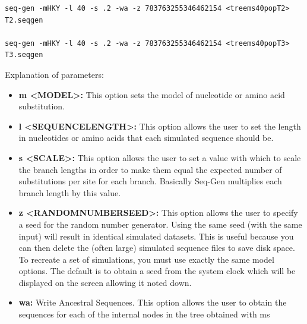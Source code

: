 \begin{itemize}
\begin{verbatim}
seq-gen -mHKY -l 40 -s .2 -wa -z 783763255346462154 <treems40popT2> T2.seqgen

seq-gen -mHKY -l 40 -s .2 -wa -z 783763255346462154 <treems40popT3> T3.seqgen

\end{verbatim}

Explanation of parameters:

\begin{itemize}

\item\textbf{m <MODEL>:} This option sets the model of nucleotide or amino acid substitution.
\item\textbf{l <SEQUENCELENGTH>:} This option allows the user to set the length in nucleotides or amino acids that each simulated sequence should be.
\item\textbf{s <SCALE>:} This option allows the user to set a value with which to scale the branch lengths in order to make them equal the expected number of substitutions per site for each branch. Basically Seq-Gen multiplies each branch length by this value.
\item\textbf{z <RANDOMNUMBERSEED>:} This option allows the user to specify a seed for the random number generator. Using the same seed (with the same input) will result in identical simulated datasets. This is useful because you can then delete the (often large) simulated sequence files to save disk space. To recreate a set of simulations, you must use exactly the same model options. The default is to obtain a seed from the system clock which will be displayed on the screen allowing it noted down.
\item\textbf{wa:}
Write Ancestral Sequences. This option allows the user to obtain the sequences for each of the internal nodes in the tree obtained with ms 
\end{itemize}

\end{itemize}

